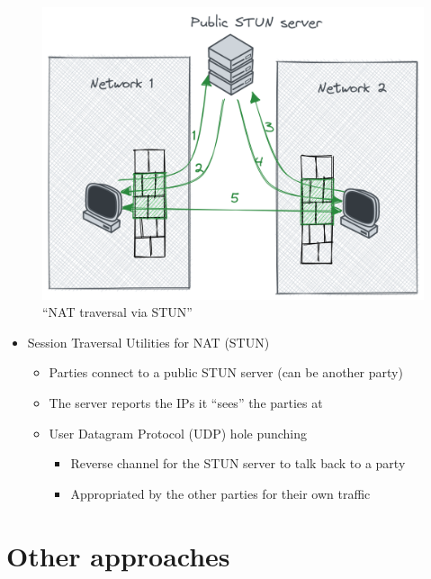 \begin{figure}
\centering
\includegraphics[width=\textwidth,height=0.66\textheight]{presentation/../figures/nat-traversal.png}
\caption{``NAT traversal via STUN''\label{nat-traversal}}
\end{figure}

\begin{itemize}
\tightlist
\item
  Session Traversal Utilities for NAT (STUN)

  \begin{itemize}
  \tightlist
  \item
    Parties connect to a public STUN server (can be another party)
  \item
    The server reports the IPs it ``sees'' the parties at
  \item
    User Datagram Protocol (UDP) hole punching

    \begin{itemize}
    \tightlist
    \item
      Reverse channel for the STUN server to talk back to a party
    \item
      Appropriated by the other parties for their own traffic
    \end{itemize}
  \end{itemize}
\end{itemize}

\hypertarget{other-approaches}{%
\chapter{Other approaches}\label{other-approaches}}

